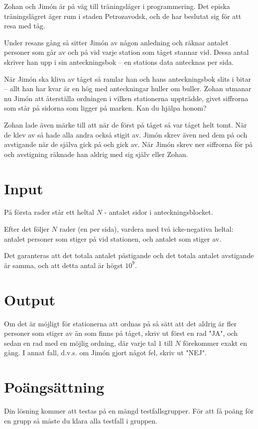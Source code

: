 
Zohan och Jimón är på väg till träningsläger i programmering. Det episka träningslägret äger rum i staden Petrozavodsk, och de har beslutat sig för att resa med tåg.

Under resans gång så sitter Jimón av någon anledning och räknar antalet personer som går av och på vid varje station som tåget stannar vid. Dessa antal skriver han
upp i sin anteckningsbok -- en stations data antecknas per sida.

När Jimón ska kliva av tåget så ramlar han och hans anteckningsbok slits i bitar -- allt han har kvar är en hög med anteckningar huller om buller. Zohan utmanar nu
Jimón att återställa ordningen i vilken stationerna uppträdde, givet siffrorna som står på sidorna som ligger på marken. Kan du hjälpa honom?

Zohan lade även märke till att när de först på tåget så var tåget helt tomt. När de klev av så hade  alla andra också stigit av.
Jimón skrev även ned dem på och avstigande när de själva gick på och gick av.
När Jimón skrev ner siffrorna för på och avstigning räknade han aldrig med sig själv eller Zohan.

\section*{Input}
På första rader står ett heltal $N$ - antalet sidor i anteckningsblocket.

Efter det följer $N$ rader (en per sida), vardera med två icke-negativa heltal: antalet personer som stiger på vid stationen, och antalet som stiger av.

Det garanteras att det totala antalet påstigande och det totala antalet avstigande är samma, och att detta antal är högst $10^9$. 

\section*{Output}
Om det är möjligt för stationerna att ordnas på så sätt att det aldrig är fler personer som stiger av än som finns på tåget, skriv ut först en rad "JA", och sedan en rad med en möjlig ordning, där varje tal $1$ till $N$ förekommer exakt en gång.
I annat fall, d.v.s. om Jimón gjort något fel, skriv ut "NEJ".

\section*{Poängsättning}
Din lösning kommer att testas på en mängd testfallsgrupper. För att få poäng för en grupp så måste du klara alla testfall i gruppen.

